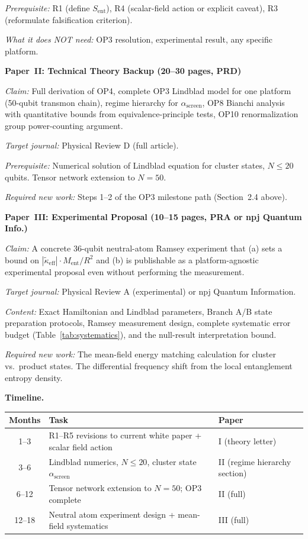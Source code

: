 \documentclass[12pt,letterpaper]{article}
\theoremstyle{plain}
\theoremstyle{definition}
\theoremstyle{remark}
\newcommand{\kteff}{\tilde{\kappa}_{\mathrm{eff}}}
\newcommand{\Sent}{S_{\mathrm{ent}}}
\newcommand{\Ment}{M_{\mathrm{ent}}}
\newcommand{\asc}{\alpha_{\mathrm{screen}}}
\begin{document}
\textit{Prerequisite:} R1 (define $\Sent$), R4 (scalar-field action or explicit caveat),
R3 (reformulate falsification criterion).

\textit{What it does NOT need:} OP3 resolution, experimental result, any specific platform.

\medskip

\noindent\textbf{Paper~II: Technical Theory Backup (20--30 pages, PRD)}

\textit{Claim:} Full derivation of OP4, complete OP3 Lindblad model for one platform
(50-qubit transmon chain), regime hierarchy for $\asc$, OP8 Bianchi analysis with
quantitative bounds from equivalence-principle tests, OP10 renormalization group
power-counting argument.

\textit{Target journal:} Physical Review D (full article).

\textit{Prerequisite:} Numerical solution of Lindblad equation for cluster states,
$N \leq 20$ qubits.  Tensor network extension to $N = 50$.

\textit{Required new work:} Steps 1--2 of the OP3 milestone path (Section~2.4 above).

\medskip

\noindent\textbf{Paper~III: Experimental Proposal (10--15 pages, PRA or npj Quantum Info.)}

\textit{Claim:} A concrete 36-qubit neutral-atom Ramsey experiment that (a) sets a
bound on $|\kteff|\cdot\Ment/R^2$ and (b) is publishable as a platform-agnostic
experimental proposal even without performing the measurement.

\textit{Target journal:} Physical Review A (experimental) or npj Quantum Information.

\textit{Content:} Exact Hamiltonian and Lindblad parameters, Branch A/B state preparation
protocols, Ramsey measurement design, complete systematic error budget
(Table~\ref{tab:systematics}), and the null-result interpretation bound.

\textit{Required new work:} The mean-field energy matching calculation for cluster vs.\
product states.  The differential frequency shift from the local entanglement entropy density.

\medskip

\noindent\textbf{Timeline.}
\begin{center}
\begin{tabular}{@{}cll@{}}
\toprule
Months & Task & Paper \\
\midrule
1--3   & R1--R5 revisions to current white paper + scalar field action & I (theory letter) \\
3--6   & Lindblad numerics, $N \leq 20$, cluster state $\asc$ & II (regime hierarchy section) \\
6--12  & Tensor network extension to $N=50$; OP3 complete & II (full) \\
12--18 & Neutral atom experiment design + mean-field systematics & III (full) \\
\bottomrule
\end{tabular}
\end{center}
\end{document}
